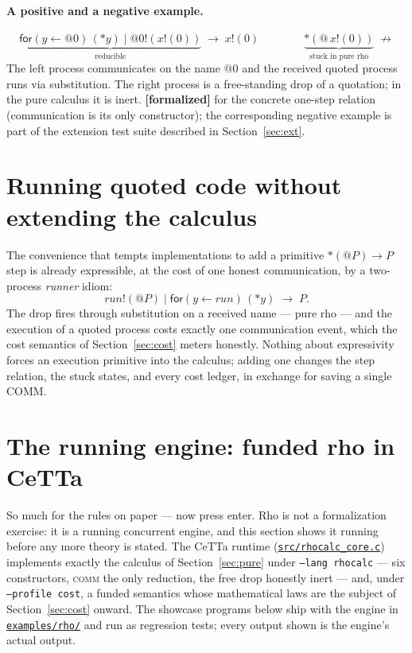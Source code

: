 \documentclass[11pt]{article}
\newcommand{\cettafile}[2]{\href{https://github.com/zariuq/CeTTa/blob/main/#1}{\code{#2}}}
\newcommand{\code}[1]{\texttt{#1}}
\newcommand{\formalized}{\textbf{[formalized]}}
\begin{document}
\paragraph{A positive and a negative example.}
\[
\underbrace{\mathsf{for}(y \leftarrow @0)\,({*}y)
\;\big|\; @0!(x!(0))}_{\text{reducible}}
\;\longrightarrow\; x!(0)
\qquad\qquad
\underbrace{{*}(@\,x!(0))}_{\text{stuck in pure rho}}
\;\not\longrightarrow
\]
The left process communicates on the name $@0$ and the received quoted
process runs via substitution. The right process is a free-standing drop
of a quotation; in the pure calculus it is inert. \formalized{} for the
concrete one-step relation (communication is its only constructor);
the corresponding negative example is part of the extension test suite
described in Section~\ref{sec:ext}.

\section{Running quoted code without extending the calculus}
\label{sec:runner}

The convenience that tempts implementations to add a primitive
${*}(@P) \to P$ step is already expressible, at the cost of one honest
communication, by a two-process \emph{runner} idiom:
\[
\mathit{run}!(@P) \;\big|\; \mathsf{for}(y \leftarrow \mathit{run})\,({*}y)
\;\longrightarrow\; P .
\]
The drop fires through substitution on a received name --- pure rho ---
and the execution of a quoted process costs exactly one communication
event, which the cost semantics of Section~\ref{sec:cost} meters
honestly. Nothing about expressivity forces an execution primitive into
the calculus; adding one changes the step relation, the stuck states,
and every cost ledger, in exchange for saving a single COMM.

\section{The running engine: funded rho in CeTTa}
\label{sec:engine}

So much for the rules on paper --- now press enter.  Rho is not a
formalization exercise: it is a running concurrent engine, and this
section shows it running before any more theory is stated.  The CeTTa
runtime (\cettafile{src/rhocalc_core.c}{src/rhocalc\_core.c}) implements
exactly the calculus of Section~\ref{sec:pure} under
\code{--lang rhocalc} --- six constructors, \textsc{comm} the only
reduction, the free drop honestly inert --- and, under
\code{--profile cost}, a funded semantics whose mathematical laws are
the subject of Section~\ref{sec:cost} onward.  The showcase programs
below ship with the engine in \cettafile{examples/rho}{examples/rho/}
and run as regression tests; every output shown is the engine's actual
output.
\end{document}
